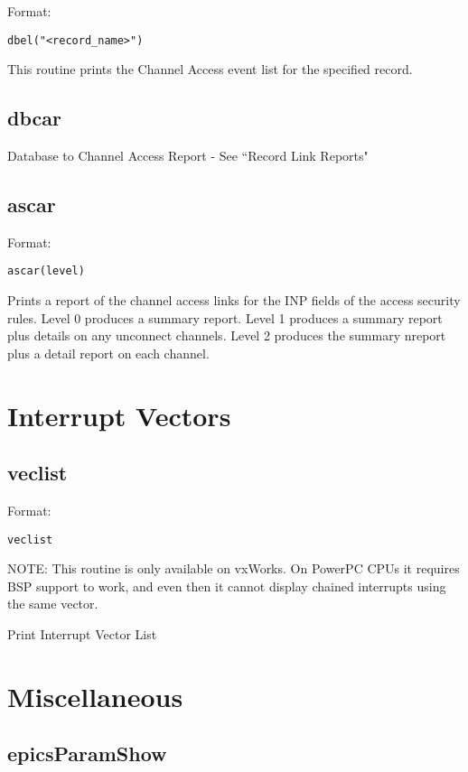 Format:

\begin{verbatim}dbel("<record_name>")
\end{verbatim}This routine prints the Channel Access event list for the specified record.

\subsection{dbcar}

Database to Channel Access Report - See ``Record Link Reports"

\subsection{ascar}

Format:

\begin{verbatim}ascar(level)
\end{verbatim}Prints a report of the channel access links for the INP fields of the access security rules. Level 0 produces a summary 
report. Level 1 produces a summary report plus details on any unconnect channels. Level 2 produces the summary nreport 
plus a detail report on each channel.

\section{Interrupt Vectors}

\subsection{veclist}

Format:

\begin{verbatim}veclist
\end{verbatim}NOTE: This routine is only available on vxWorks. On PowerPC CPUs it requires BSP support to work, and even then it 
cannot display chained interrupts using the same vector.

Print Interrupt Vector List

\section{Miscellaneous}

\subsection{epicsParamShow}

